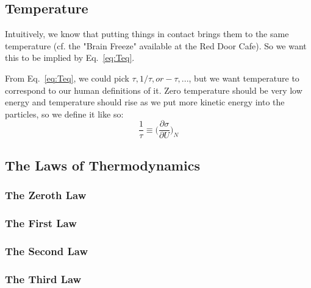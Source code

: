 \subsection{Temperature}
\label{s:Temperature}

Intuitively, we know that putting things in contact brings them to the same temperature
(cf. the "Brain Freeze" available at the Red Door Cafe). So we want this to be
implied by Eq.~\ref{eq:Teq}.

From Eq.~\ref{eq:Teq}, we could pick $\tau, 1/\tau, or -\tau,...$, but we want temperature
to correspond to our human definitions of it. Zero temperature should be very low energy
and temperature should rise as we put more kinetic energy into the particles, so we define
it like so:
\begin{equation}
\frac{1}{\tau} \equiv \bigg(\frac{\partial \sigma}{\partial U}\bigg)_{N}
\label{eq:T}
\end{equation}

\subsection{The Laws of Thermodynamics}

\subsubsection{The Zeroth Law}

\subsubsection{The First Law}

\subsubsection{The Second Law}

\subsubsection{The Third Law}



